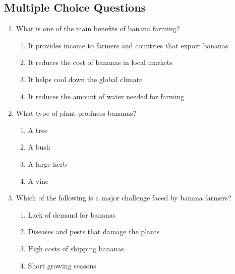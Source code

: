\documentclass[12pt]{article}
\begin{document}
\subsection*{Multiple Choice Questions}

\begin{enumerate}

    \item What is one of the main benefits of banana farming?

    \begin{enumerate}[label=\Alph*.]
        \item It provides income to farmers and countries that export bananas
        \item It reduces the cost of bananas in local markets
        \item It helps cool down the global climate
        \item It reduces the amount of water needed for farming
    \end{enumerate}
    
    \vspace{0.5cm}

    \item What type of plant produces bananas?

    \begin{enumerate}[label=\Alph*.]
        \item A tree
        \item A bush
        \item A large herb
        \item A vine
    \end{enumerate}
    
    \vspace{0.5cm}

    \item Which of the following is a major challenge faced by banana farmers?

    \begin{enumerate}[label=\Alph*.]
        \item Lack of demand for bananas
        \item Diseases and pests that damage the plants
        \item High costs of shipping bananas
        \item Short growing seasons
    \end{enumerate}
    
    \vspace{0.5cm}


\end{enumerate}
\end{document}
